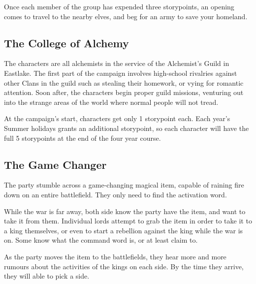 {{\begin{multicols}{2}
Once each member of the group has expended three \glspl{storypoint}, an opening comes to travel to the nearby elves, and beg for an army to save your homeland.

\subsection{The College of Alchemy}

The characters are all alchemists in the service of the Alchemist's Guild in Eastlake.
The first part of the campaign involves high-school rivalries against other Clans in the guild such as stealing their homework, or vying for romantic attention.
Soon after, the characters begin proper guild missions, venturing out into the strange areas of the world where normal people will not tread.

At the campaign's start, characters get only 1 \gls{storypoint} each.
Each year's Summer holidays grants an additional \gls{storypoint}, so each character will have the full 5 \glspl{storypoint} at the end of the four year course.

\subsection{The Game Changer}

The party stumble across a game-changing magical item, capable of raining fire down on an entire battlefield.
They only need to find the activation word.

While the war is far away, both side know the party have the item, and want to take it from them.
Individual lords attempt to grab the item in order to take it to a king themselves, or even to start a rebellion against the king while the war is on.
Some know what the command word is, or at least claim to.

As the party moves the item to the battlefields, they hear more and more rumours about the activities of the kings on each side.
By the time they arrive, they will able to pick a side.

\end{multicols}

}{}
}{}
